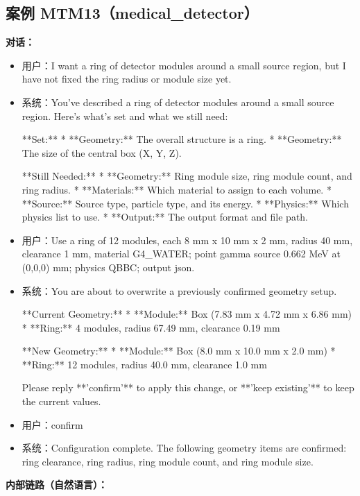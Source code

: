 \documentclass[11pt]{ctexart}
\begin{document}
\subsection{案例 MTM13（medical\_detector）}
\textbf{对话：}
\begin{itemize}
\item 用户：I want a ring of detector modules around a small source region, but I have not fixed the ring radius or module size yet.
\item 系统：You've described a ring of detector modules around a small source region. Here's what's set and what we still need:

**Set:**
*   **Geometry:** The overall structure is a ring.
*   **Geometry:** The size of the central box (X, Y, Z).

**Still Needed:**
*   **Geometry:** Ring module size, ring module count, and ring radius.
*   **Materials:** Which material to assign to each volume.
*   **Source:** Source type, particle type, and its energy.
*   **Physics:** Which physics list to use.
*   **Output:** The output format and file path.
\item 用户：Use a ring of 12 modules, each 8 mm x 10 mm x 2 mm, radius 40 mm, clearance 1 mm, material G4\_WATER; point gamma source 0.662 MeV at (0,0,0) mm; physics QBBC; output json.
\item 系统：You are about to overwrite a previously confirmed geometry setup.

**Current Geometry:**
*   **Module:** Box (7.83 mm x 4.72 mm x 6.86 mm)
*   **Ring:** 4 modules, radius 67.49 mm, clearance 0.19 mm

**New Geometry:**
*   **Module:** Box (8.0 mm x 10.0 mm x 2.0 mm)
*   **Ring:** 12 modules, radius 40.0 mm, clearance 1.0 mm

Please reply **'confirm'** to apply this change, or **'keep existing'** to keep the current values.
\item 用户：confirm
\item 系统：Configuration complete. The following geometry items are confirmed: ring clearance, ring radius, ring module count, and ring module size.
\end{itemize}
\textbf{内部链路（自然语言）：}
\end{document}

